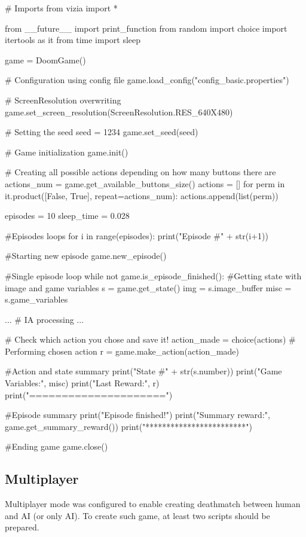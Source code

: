 \begin{pblock}
# Imports
from vizia import *

from __future__ import print_function
from random import choice
import itertools as it
from time import sleep

game = DoomGame()

# Configuration using config file
game.load_config("config_basic.properties")

# ScreenResolution overwriting  
game.set_screen_resolution(ScreenResolution.RES_640X480)

# Setting the seed
seed = 1234
game.set_seed(seed)

# Game initialization 
game.init()

# Creating all possible actions depending on how many buttons there are
actions_num = game.get_available_buttons_size()
actions = []
for perm in it.product([False, True], repeat=actions_num):
    actions.append(list(perm))

episodes = 10
sleep_time = 0.028

#Episodes loops
for i in range(episodes):
	print("Episode #" + str(i+1))

	#Starting new episode
	game.new_episode()

	#Single episode loop
	while not game.is_episode_finished():
		#Getting state with image and game variables
		s = game.get_state()
		img = s.image_buffer
		misc = s.game_variables

		...
		# IA processing
		...		
		
		# Check which action you chose and save it!
		action_made = choice(actions)
		# Performing chosen action
		r = game.make_action(action_made)
		
		#Action and state summary
		print("State #" + str(s.number))
		print("Game Variables:", misc)
		print("Last Reward:", r)
		print("=====================")
	
	#Episode summary
	print("Episode finished!")
	print("Summary reward:", game.get_summary_reward())
	print("************************")

#Ending game
game.close()
\end{pblock}

\subsection {Multiplayer}
	Multiplayer mode was configured to enable creating deathmatch between human and AI (or only AI). To create such game, at least two scripts should be prepared.


